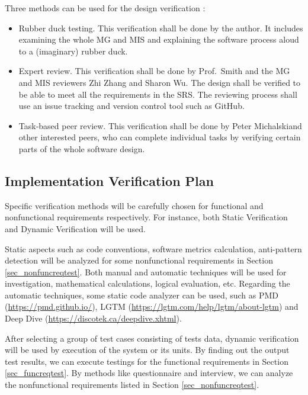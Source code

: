 \documentclass[12pt, titlepage]{article}
\begin{document}

Three methods can be used for the design verification
\cite{Soraine2019SystVnv}:\begin{itemize}
\item Rubber duck testing. This verification shall be done by the author. It
includes examining the whole MG and MIS and explaining the software process
aloud to a (imaginary) rubber duck.

\item Expert review. This verification shall be done by Prof.\ Smith and the MG
and MIS reviewers Zhi Zhang and Sharon Wu. The design shall be verified to be
able to meet all the requirements in the SRS. The reviewing process shall use
an issue tracking and version control tool such as GitHub.

\item Task-based peer review. This verification shall be done by Peter
Michalskiand other interested peers, who can complete individual tasks by
verifying
certain parts of the whole software design.
\end{itemize}

\subsection{Implementation Verification Plan}

Specific verification methods will be carefully chosen for functional and
nonfunctional requirements respectively. For instance, both Static Verification
and Dynamic Verification will be used.
    
    Static aspects such as code conventions, software metrics calculation,
anti-pattern detection will be analyzed for some nonfunctional requirements in
Section \ref{sec_nonfuncreqtest}. Both manual and automatic techniques will be
used for investigation, mathematical calculations, logical evaluation,
etc. Regarding the automatic techniques, some static code analyzer can be used,
such as PMD (\url{https://pmd.github.io/}), 
LGTM (\url{https://lgtm.com/help/lgtm/about-lgtm}) and Deep Dive
(\url{https://discotek.ca/deepdive.xhtml}).
    
    After selecting a group of test cases consisting of tests data, dynamic
verification will be used by execution of the system or its units. By finding
out the output test results, we can execute testings for the functional
requirements in Section \ref{sec_funcreqtest}. By methods like questionnaire
and interview, we can analyze the nonfunctional requirements listed in Section
\ref{sec_nonfuncreqtest}.
\end{document}
